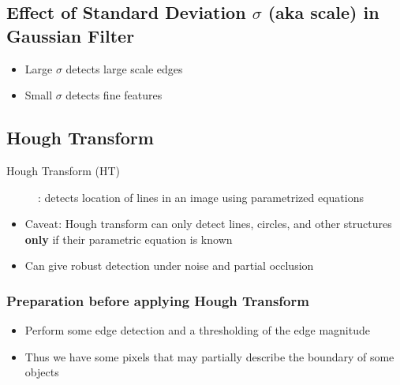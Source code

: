 \documentclass[letterpaper,12pt]{article}
\begin{document}
\subsection{Effect of Standard Deviation $\sigma$ (aka scale) in Gaussian Filter}
\begin{itemize}
 \item Large $\sigma$ detects large scale edges
 \item Small $\sigma$ detects fine features
\end{itemize}


\subsection{Hough Transform}
\begin{description}
 \item[Hough Transform (HT)]: detects location of lines in an image using parametrized equations
\end{description}
\begin{itemize}
 \item Caveat: Hough transform can only detect lines, circles, and other structures \textbf{only} if their parametric equation is known
 \item Can give robust detection under noise and partial occlusion
\end{itemize}

\subsubsection{Preparation before applying Hough Transform}
\begin{itemize}
 \item Perform some edge detection and a thresholding of the edge magnitude
 \item Thus we have some pixels that may partially describe the boundary of some objects
\end{itemize}
\end{document}
